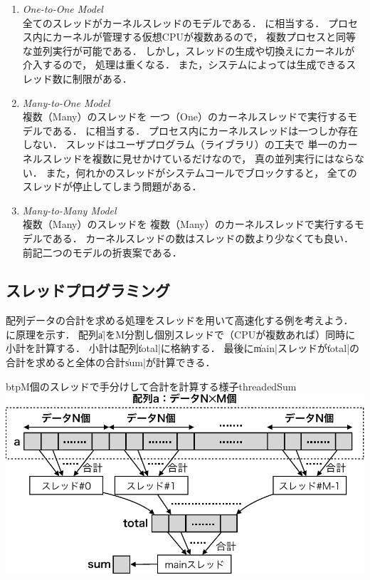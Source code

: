 \begin{enumerate}
\item \emph{One-to-One Model} \\
  全てのスレッドがカーネルスレッドのモデルである．
  に相当する．
  プロセス内にカーネルが管理する仮想CPUが複数あるので，
  複数プロセスと同等な並列実行が可能である．
  しかし，スレッドの生成や切換えにカーネルが介入するので，
  処理は重くなる．
  また，システムによっては生成できるスレッド数に制限がある．
\item \emph{Many-to-One Model} \\
  複数（Many）のスレッドを
  一つ（One）のカーネルスレッドで実行するモデルである．
  に相当する．
  プロセス内にカーネルスレッドは一つしか存在しない．
  スレッドはユーザプログラム（ライブラリ）の工夫で
  単一のカーネルスレッドを複数に見せかけているだけなので，
  真の並列実行にはならない．
  また，何れかのスレッドがシステムコールでブロックすると，
  全てのスレッドが停止してしまう問題がある．
\item \emph{Many-to-Many Model} \\
  複数（Many）のスレッドを
  複数（Many）のカーネルスレッドで実行するモデルである．
  カーネルスレッドの数はスレッドの数より少なくても良い．
  前記二つのモデルの折衷案である．
\end{enumerate}

\subsection{スレッドプログラミング}
配列データの合計を求める処理をスレッドを用いて高速化する例を考えよう．
に原理を示す．
配列\|a|をM分割し個別スレッドで（CPUが複数あれば）同時に小計を計算する．
小計は配列\|total|に格納する．
最後に\|main|スレッドが\|total|の合計を求めると全体の合計\|sum|が計算できる．

\begin{myfig}{btp}{M個のスレッドで手分けして合計を計算する様子}{threadedSum}
  \includegraphics[scale=0.66]{Fig/threadedSum-crop.pdf}
\end{myfig}

